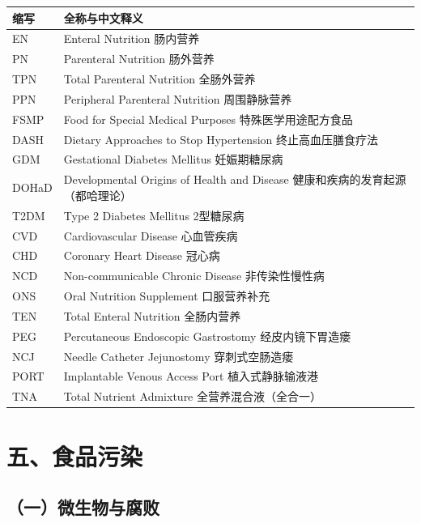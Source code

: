 \begin{table}[H]
\centering
\begin{tabularx}{\textwidth}{lX}
\toprule
\textbf{缩写} & \textbf{全称与中文释义} \\
\midrule
EN & Enteral Nutrition \hfill 肠内营养 \\
PN & Parenteral Nutrition \hfill 肠外营养 \\
TPN & Total Parenteral Nutrition \hfill 全肠外营养 \\
PPN & Peripheral Parenteral Nutrition \hfill 周围静脉营养 \\
FSMP & Food for Special Medical Purposes \hfill 特殊医学用途配方食品 \\
DASH & Dietary Approaches to Stop Hypertension \hfill 终止高血压膳食疗法 \\
GDM & Gestational Diabetes Mellitus \hfill 妊娠期糖尿病 \\
DOHaD & Developmental Origins of Health and Disease \hfill 健康和疾病的发育起源（都哈理论） \\
T2DM & Type 2 Diabetes Mellitus \hfill 2型糖尿病 \\
CVD & Cardiovascular Disease \hfill 心血管疾病 \\
CHD & Coronary Heart Disease \hfill 冠心病 \\
NCD & Non-communicable Chronic Disease \hfill 非传染性慢性病 \\
ONS & Oral Nutrition Supplement \hfill 口服营养补充 \\
TEN & Total Enteral Nutrition \hfill 全肠内营养 \\
PEG & Percutaneous Endoscopic Gastrostomy \hfill 经皮内镜下胃造瘘 \\
NCJ & Needle Catheter Jejunostomy \hfill 穿刺式空肠造瘘 \\
PORT & Implantable Venous Access Port \hfill 植入式静脉输液港 \\
TNA & Total Nutrient Admixture \hfill 全营养混合液（全合一） \\
\bottomrule
\end{tabularx}
\end{table}

\section{五、食品污染}

\subsection*{（一）微生物与腐败}

